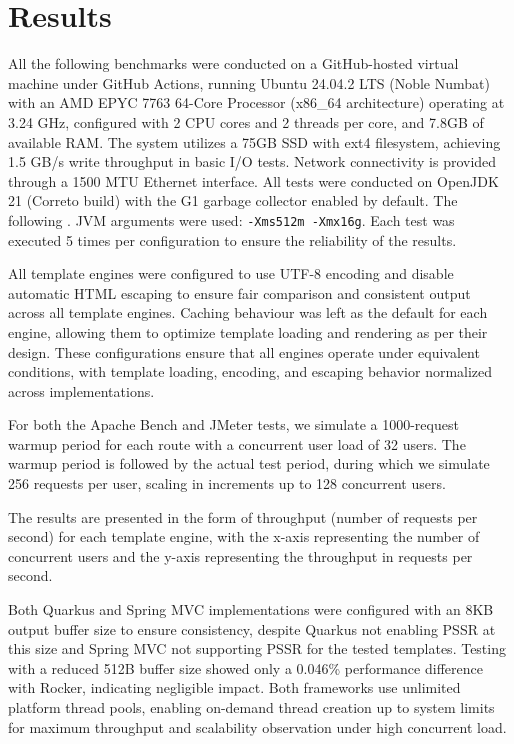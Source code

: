 \section{Results}

All the following benchmarks were conducted on a GitHub-hosted virtual machine
under GitHub Actions, running Ubuntu 24.04.2 LTS (Noble Numbat) with an AMD
EPYC 7763 64-Core Processor (x86\_64 architecture) operating at 3.24 GHz,
configured with 2 CPU cores and 2 threads per core, and 7.8GB of available RAM.
The system utilizes a 75GB SSD with ext4 filesystem, achieving 1.5 GB/s write
throughput in basic I/O tests. Network connectivity is provided through a 1500
MTU Ethernet interface. All tests were conducted on OpenJDK 21 (Correto build)
with the G1 garbage collector enabled by default. The following . JVM arguments
were used: \texttt{-Xms512m -Xmx16g}. Each test was executed 5 times per
configuration to ensure the reliability of the results.

All template engines were configured to use UTF-8 encoding and disable
automatic HTML escaping to ensure fair comparison and consistent output across
all template engines. Caching behaviour was left as the default for each
engine, allowing them to optimize template loading and rendering as per their
design. These configurations ensure that all engines operate under equivalent
conditions, with template loading, encoding, and escaping behavior normalized
across implementations.

For both the Apache Bench and JMeter tests, we simulate a 1000-request warmup
period for each route with a concurrent user load of 32 users. The warmup
period is followed by the actual test period, during which we simulate 256
requests per user, scaling in increments up to 128 concurrent users.

The results are presented in the form of throughput (number of requests per
second) for each template engine, with the x-axis representing the number of
concurrent users and the y-axis representing the throughput in requests per
second.

Both Quarkus and Spring MVC implementations were configured with an 8KB output
buffer size to ensure consistency, despite Quarkus not enabling PSSR at this
size and Spring MVC not supporting PSSR for the tested templates. Testing with
a reduced 512B buffer size showed only a 0.046\% performance difference with
Rocker, indicating negligible impact. Both frameworks use unlimited platform
thread pools, enabling on-demand thread creation up to system limits for
maximum throughput and scalability observation under high concurrent load.

